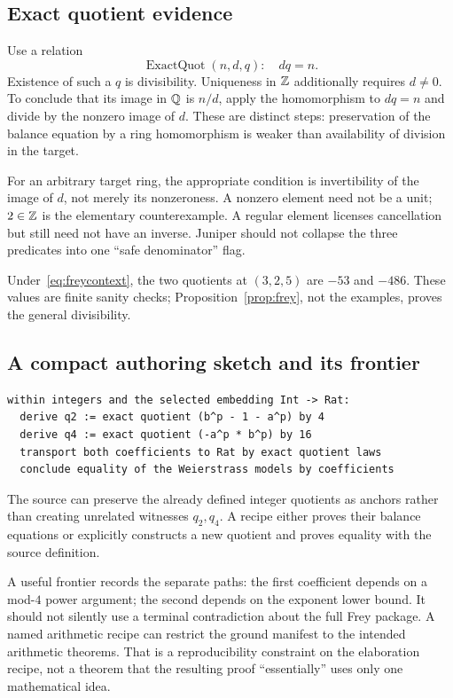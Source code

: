 \documentclass[11pt,a4paper]{article}
\theoremstyle{definition}\newtheorem{definition}[theorem]{Definition}
\theoremstyle{remark}\newtheorem{remark}[theorem]{Remark}
\begin{document}
\subsection{Exact quotient evidence}
Use a relation
\[
 \operatorname{ExactQuot}(n,d,q):\quad dq=n.
\]
Existence of such a $q$ is divisibility. Uniqueness in $\mathbb Z$ additionally requires $d\ne0$. To conclude that its image in $\mathbb Q$ is $n/d$, apply the homomorphism to $dq=n$ and divide by the nonzero image of $d$. These are distinct steps: preservation of the balance equation by a ring homomorphism is weaker than availability of division in the target.

For an arbitrary target ring, the appropriate condition is invertibility of the image of $d$, not merely its nonzeroness. A nonzero element need not be a unit; $2\in\mathbb Z$ is the elementary counterexample. A regular element licenses cancellation but still need not have an inverse. Juniper should not collapse the three predicates into one ``safe denominator'' flag.

Under~\eqref{eq:freycontext}, the two quotients at $(3,2,5)$ are $-53$ and $-486$. These values are finite sanity checks; Proposition~\ref{prop:frey}, not the examples, proves the general divisibility.

\subsection{A compact authoring sketch and its frontier}
\begin{lstlisting}
within integers and the selected embedding Int -> Rat:
  derive q2 := exact quotient (b^p - 1 - a^p) by 4
  derive q4 := exact quotient (-a^p * b^p) by 16
  transport both coefficients to Rat by exact quotient laws
  conclude equality of the Weierstrass models by coefficients
\end{lstlisting}
The source can preserve the already defined integer quotients as anchors rather than creating unrelated witnesses $q_2,q_4$. A recipe either proves their balance equations or explicitly constructs a new quotient and proves equality with the source definition.

A useful frontier records the separate paths: the first coefficient depends on a mod-$4$ power argument; the second depends on the exponent lower bound. It should not silently use a terminal contradiction about the full Frey package. A named arithmetic recipe can restrict the ground manifest to the intended arithmetic theorems. That is a reproducibility constraint on the elaboration recipe, not a theorem that the resulting proof ``essentially'' uses only one mathematical idea.
\end{document}
